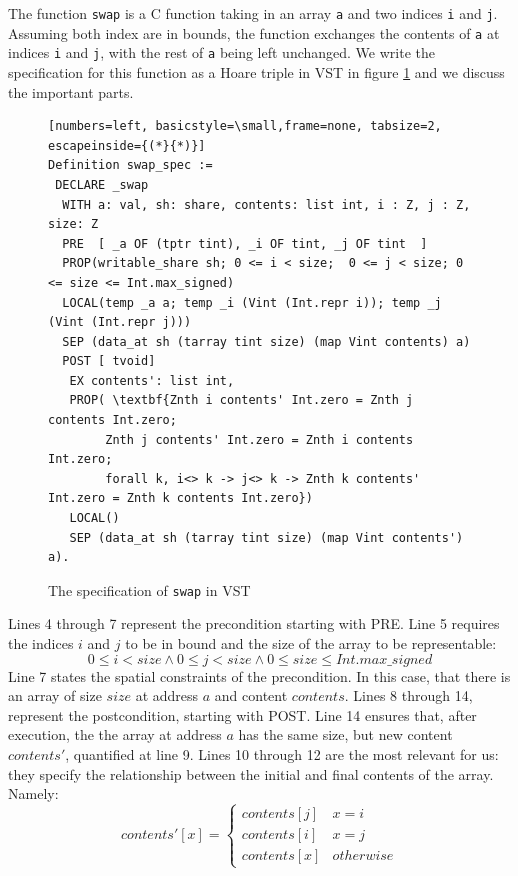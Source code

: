 \documentclass[onecolumn, preprint]{sigplanconf}
\begin{document}
The function \texttt{swap} is a C function taking in an array \texttt{a} and two indices \texttt{i} and \texttt{j}. Assuming both index are in bounds, the function exchanges the contents of \texttt{a} at indices \texttt{i} and \texttt{j}, with the rest of \texttt{a} being left unchanged. We write the specification for this function as a Hoare triple in VST in figure \ref{fig:hoarswap} and we discuss the important parts.
\begin{figure}
\begin{lstlisting}[numbers=left, basicstyle=\small,frame=none, tabsize=2, escapeinside={(*}{*)}]  
Definition swap_spec :=
 DECLARE _swap
  WITH a: val, sh: share, contents: list int, i : Z, j : Z, size: Z
  PRE  [ _a OF (tptr tint), _i OF tint, _j OF tint  ]
  PROP(writable_share sh; 0 <= i < size;  0 <= j < size; 0 <= size <= Int.max_signed)
  LOCAL(temp _a a; temp _i (Vint (Int.repr i)); temp _j (Vint (Int.repr j)))
  SEP (data_at sh (tarray tint size) (map Vint contents) a)
  POST [ tvoid]
   EX contents': list int,
   PROP( \textbf{Znth i contents' Int.zero = Znth j contents Int.zero;
        Znth j contents' Int.zero = Znth i contents Int.zero;
        forall k, i<> k -> j<> k -> Znth k contents' Int.zero = Znth k contents Int.zero})
   LOCAL()
   SEP (data_at sh (tarray tint size) (map Vint contents') a).
\end{lstlisting}
\label{fig:hoarswap}
   \caption{The specification of \texttt{swap} in VST}
\end{figure}
Lines 4 through 7 represent the precondition starting with PRE. Line 5 requires the indices $i$ and $j$ to be in bound and the size of the array to be representable:
$$ 0 \leq i < size \wedge 0 \leq j < size  \wedge 0 \leq size \leq Int.max\_signed $$
Line 7 states the spatial constraints of the precondition. In this case, that there is an array of size $size$ at address $a$ and content $contents$. Lines 8 through 14, represent the postcondition, starting with POST. Line 14 ensures that, after execution, the the array at address $a$ has the same size, but new content $contents'$, quantified at line 9. Lines 10 through 12 are the most relevant for us: they specify the relationship between the initial and final contents of the array. Namely:
$$contents'[x] = \left\{\begin{array}{cc}contents[j] & x = i \\contents[i] & x = j \\contents[x] & otherwise\end{array}\right.$$
\end{document}
